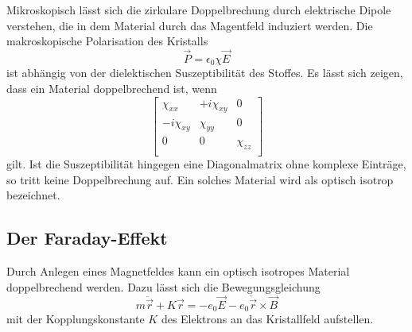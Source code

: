 Mikroskopisch lässt sich die zirkulare Doppelbrechung durch elektrische Dipole verstehen, die in dem Material durch das 
Magentfeld induziert werden. Die makroskopische Polarisation des Kristalls 
\begin{equation*}
    \vec{P}=\epsilon_0\chi\vec{E}
\end{equation*}
ist abhängig von der dielektischen Suszeptibilität des Stoffes. Es lässt sich zeigen, dass ein Material doppelbrechend ist, wenn
\begin{equation}
    \left[
        \begin{array}{ccc}
        \chi_{xx}          & +i\chi_{xy} & 0         \\ 
        -i\chi_{xy}   & \chi_{yy}        & 0         \\
        0                  & 0                & \chi_{zz} \\ 
    \end{array}
    \right]
    \label{eqn:chi}
\end{equation}
gilt. Ist die Suszeptibilität hingegen eine Diagonalmatrix ohne komplexe Einträge, so tritt keine Doppelbrechung auf. Ein solches 
Material wird als optisch isotrop bezeichnet. 

\subsection{Der Faraday-Effekt}
Durch Anlegen eines Magnetfeldes kann ein optisch isotropes Material doppelbrechend werden. Dazu lässt sich die Bewegungsgleichung
\begin{equation*}
    m\ddot{\vec{r}}+K\vec{r}=-e_0\vec{E}-e_0\dot{\vec{r}}\times\vec{B}
\end{equation*}
mit der Kopplungskonstante $K$ des Elektrons an das Kristallfeld aufstellen.

